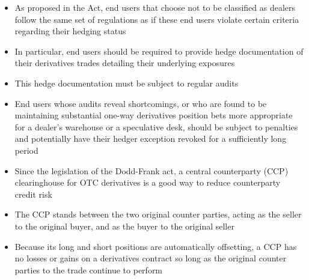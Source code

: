 \documentclass[11pt]{beamer}
\begin{document}
\begin{frame}
\begin{itemize}
\item As proposed in the Act, end users that choose not to be classified as dealers follow the same set of regulations as if these end users violate certain criteria regarding their hedging status
\item In particular, end users should be required to provide hedge documentation of their derivatives trades detailing their underlying exposures
\item This hedge documentation must be subject to regular audits
\item End users whose audits reveal shortcomings, or who are found to be maintaining substantial one-way derivatives position bets more appropriate for a dealer’s warehouse or a speculative desk, should be subject to penalties and potentially have their hedger exception revoked for a sufficiently long period
\end{itemize}
\end{frame}

\begin{frame}
\begin{itemize}
\item Since the legislation of the Dodd-Frank act, a central counterparty (CCP) clearinghouse for OTC derivatives is a good way to reduce counterparty credit risk
\item The CCP stands between the two original counter parties, acting as the seller to the original buyer, and as the buyer to the original seller
\item Because its long and short positions are automatically offsetting, a CCP has no losses or gains on a derivatives contract so long as the original counter parties to the trade continue to perform
\end{itemize}
\end{frame}
\end{document}
